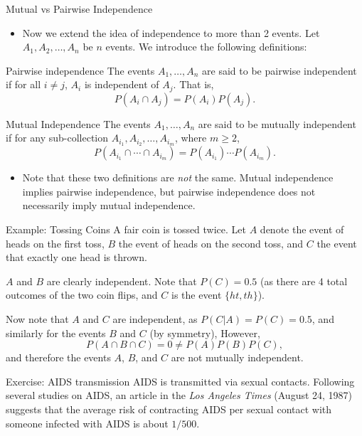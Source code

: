 \begin{frame}[allowframebreaks]{Mutual vs Pairwise Independence}
  \begin{itemize}
    \item Now we extend the idea of independence to more than 2 events. Let $A_1, A_2, \ldots, A_n$ be $n$ events. We introduce the following definitions:
  \end{itemize}

  \begin{block}{Pairwise independence}
    The events $A_1, \ldots, A_n$ are said to be \alert{pairwise independent} if for all $i \neq j$, $A_i$ is independent of $A_j$. That is,
    $$
    P(A_i \cap A_j) = P(A_i)P(A_j).
    $$
  \end{block}

  \begin{block}{Mutual Independence}
    The events $A_1, \ldots, A_n$ are said to be \alert{mutually independent} if for any sub-collection $A_{i_1}, A_{i_2}, \ldots, A_{i_m}$, where $m \geq 2$,
    $$
    P(A_{i_1} \cap \cdots \cap A_{i_m}) = P(A_{i_1})\cdots P(A_{i_m}).
    $$
  \end{block}

  \begin{itemize}
    \item Note that these two definitions are \emph{not} the same. Mutual independence implies pairwise independence, but pairwise independence does not necessarily imply mutual independence.
  \end{itemize}

  \begin{exampleblock}{Example: Tossing Coins}
    A fair coin is tossed twice. Let $A$ denote the event of heads on the first toss, $B$ the event of heads on the second toss, and $C$ the event that exactly one head is thrown.

    $A$ and $B$ are clearly independent. Note that $P(C) = 0.5$ (as there are 4 total outcomes of the two coin flips, and $C$ is the event $\{ht, th\}$).

    Now note that $A$ and $C$ are independent, as $P(C | A) = P(C) = 0.5$, and similarly for the events $B$ and $C$ (by symmetry), However,
    $$
    P(A \cap B \cap C) = 0 \neq P(A)P(B)P(C),
    $$
    and therefore the events $A$, $B$, and $C$ are not mutually independent.
  \end{exampleblock}

  \framebreak

  \begin{exampleblock}{Exercise: AIDS transmission}
    AIDS is transmitted via sexual contacts. Following several studies on AIDS, an article in the \emph{Los Angeles Times} (August 24, 1987) suggests that the average risk of contracting AIDS per sexual contact with someone infected with AIDS is about $1/500$.


\end{exampleblock}
\end{frame}
